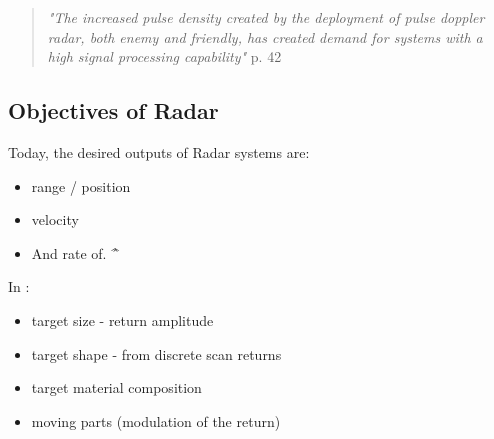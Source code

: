 
\begin{quote}
    \textit{"The increased pulse density created by the deployment of pulse doppler radar, both enemy and friendly, has created demand for systems with a high signal processing capability"} \cite{pettersson_illustrated_1992} p. 42
\end{quote}


\subsection{Objectives of Radar}

Today, the desired outputs of Radar systems are: \cite{stimson_introduction_1998}

\begin{itemize}
    \item range / position
    \item velocity
    \item And rate of. \^\^
\end{itemize}

In :\cite{jenn_radar_2007}
\begin{itemize}
    \item target size - return amplitude
    \item target shape - from discrete scan returns
    \item target material composition
    \item moving parts (modulation of the return)
\end{itemize}





